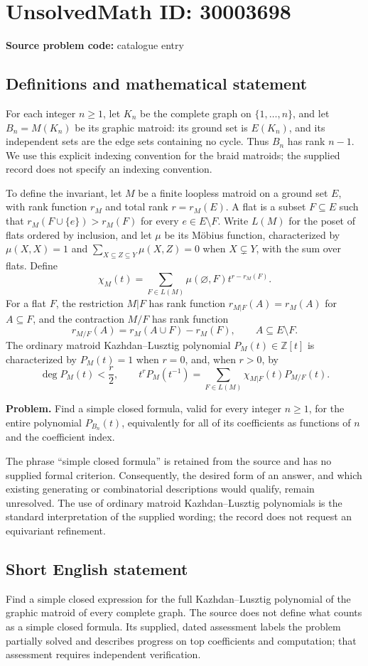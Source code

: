 \documentclass[11pt]{article}
\newcommand{\Z}{\mathbb{Z}}
\begin{document}
\section*{UnsolvedMath ID: 30003698}
\textbf{Source problem code:} catalogue entry
\subsection{Definitions and mathematical statement}
For each integer \(n\geq 1\), let \(K_n\) be the complete graph on \(\{1,\ldots,n\}\), and let \(B_n=M(K_n)\) be its graphic matroid: its ground set is \(E(K_n)\), and its independent sets are the edge sets containing no cycle. Thus \(B_n\) has rank \(n-1\). We use this explicit indexing convention for the braid matroids; the supplied record does not specify an indexing convention.

To define the invariant, let \(M\) be a finite loopless matroid on a ground set \(E\), with rank function \(r_M\) and total rank \(r=r_M(E)\). A flat is a subset \(F\subseteq E\) such that \(r_M(F\cup\{e\})>r_M(F)\) for every \(e\in E\setminus F\). Write \(L(M)\) for the poset of flats ordered by inclusion, and let \(\mu\) be its M\"obius function, characterized by \(\mu(X,X)=1\) and \(\sum_{X\subseteq Z\subseteq Y}\mu(X,Z)=0\) when \(X\subsetneq Y\), with the sum over flats. Define
\[
\chi_M(t)=\sum_{F\in L(M)}\mu(\varnothing,F)t^{r-r_M(F)}.
\]
For a flat \(F\), the restriction \(M|F\) has rank function \(r_{M|F}(A)=r_M(A)\) for \(A\subseteq F\), and the contraction \(M/F\) has rank function
\[
r_{M/F}(A)=r_M(A\cup F)-r_M(F),\qquad A\subseteq E\setminus F.
\]
The ordinary matroid Kazhdan--Lusztig polynomial \(P_M(t)\in\Z[t]\) is characterized by \(P_M(t)=1\) when \(r=0\), and, when \(r>0\), by
\[
\deg P_M(t)<\frac r2,
\qquad
 t^rP_M(t^{-1})=\sum_{F\in L(M)}\chi_{M|F}(t)P_{M/F}(t).
\]

\textbf{Problem.} Find a simple closed formula, valid for every integer \(n\geq1\), for the entire polynomial \(P_{B_n}(t)\), equivalently for all of its coefficients as functions of \(n\) and the coefficient index.

The phrase ``simple closed formula'' is retained from the source and has no supplied formal criterion. Consequently, the desired form of an answer, and which existing generating or combinatorial descriptions would qualify, remain unresolved. The use of ordinary matroid Kazhdan--Lusztig polynomials is the standard interpretation of the supplied wording; the record does not request an equivariant refinement.
\subsection{Short English statement}
Find a simple closed expression for the full Kazhdan--Lusztig polynomial of the graphic matroid of every complete graph. The source does not define what counts as a simple closed formula. Its supplied, dated assessment labels the problem partially solved and describes progress on top coefficients and computation; that assessment requires independent verification.
\end{document}
